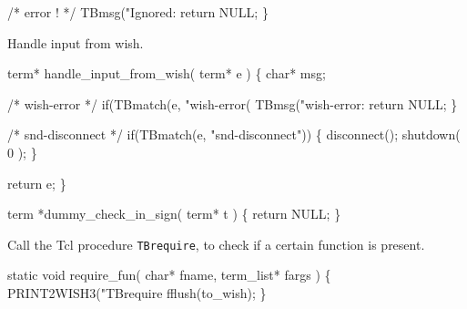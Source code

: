    /* error ! */
   TBmsg("Ignored: %
   return NULL;
\}
\nwendcode{}\nwdocspar


Handle input from wish.

\nwenddocs{}\endmoddef\let\nwnotused=\nwoutput{}\nwstartdeflinemarkup{}\nwenddeflinemarkup
term* handle_input_from_wish( term* e ) 
\{
   char* msg;

   /* wish-error */
   if(TBmatch(e, "wish-error( %
      TBmsg("wish-error: %
      return NULL;
   \}

   /* snd-disconnect */
   if(TBmatch(e, "snd-disconnect")) \{
      disconnect();
      shutdown( 0 );
   \}
      
   return e;
\}
\nwendcode{}\nwdocspar



\nwenddocs{}\endmoddef\let\nwnotused=\nwoutput{}\nwstartdeflinemarkup{}\nwenddeflinemarkup
term *dummy_check_in_sign( term* t )
\{
   return NULL;
\}
\nwendcode{}\nwdocspar


Call the Tcl procedure {\tt TBrequire}, to check if a certain
function is present.

\nwenddocs{}\endmoddef\let\nwnotused=\nwoutput{}\nwstartdeflinemarkup{}\nwenddeflinemarkup
static void require_fun( char* fname, term_list* fargs )
\{
   PRINT2WISH3("TBrequire %
   fflush(to_wish);
\}
\nwendcode{}\nwdocspar


